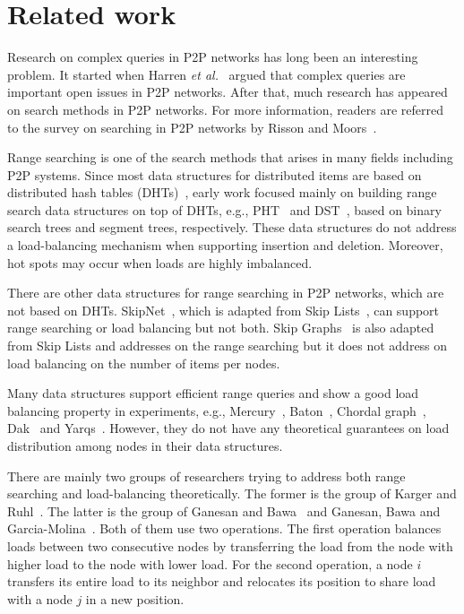 \documentclass[a4paper]{article}
\begin{document}
\section{Related work}
\label{sec:relatedwork}

Research on complex queries in P2P networks has long been an
interesting problem. It started when Harren {\em et
  al.}~\cite{Harren02complexqueries} argued that  complex queries
are important open issues in P2P networks. After that, much research has appeared on search methods in P2P networks. For more
information, readers are referred to the survey on searching in P2P
networks by Risson and Moors~\cite{Risson06Survey}.

Range searching is one of the search methods that arises in many fields
including P2P systems. Since most data structures for distributed
items are based on distributed hash tables (DHTs)~\cite{Kademlia02, CAN01,
  Pastry01,  Chord03, tapestry04}, early work focused mainly
on building range search data structures on top of DHTs, e.g.,
PHT~\cite{PHT2004} and DST~\cite{DST06}, based on binary search trees
and segment trees, respectively. These data structures do not address a
load-balancing mechanism when supporting insertion and deletion. Moreover,
hot spots may occur when loads are highly imbalanced.

There are other data structures for range searching in P2P networks,
which are not based on DHTs. SkipNet~\cite{SkipNet03}, which is adapted
from Skip Lists~\cite{skiplist90}, can support range searching or load
balancing but not both. Skip Graphs~\cite{Aspnes-SODA03} is also adapted from Skip Lists and
addresses on the range searching but it does not address on load balancing on the number of items per nodes.

Many data structures support efficient range queries and show a good 
load balancing property in experiments, e.g.,
Mercury~\cite{Mercury_sigcomm04}, Baton~\cite{baton05},
 Chordal graph~\cite{Joung08}, Dak~\cite{Dak06} and
Yarqs~\cite{Yarqs09}. However, they do not have any
theoretical guarantees on load distribution among nodes in their data
structures.

There are mainly two groups of researchers trying to address both range searching and
load-balancing theoretically. The former is the group of Karger and Ruhl~\cite{Karger03newalgorithms, 
Karger04simpleefficient}. The latter is the group of Ganesan and Bawa~\cite{Ganesan03} 
and Ganesan, Bawa and Garcia-Molina~\cite{GanesanBGM04-vldb}. 
Both of them use two operations. The first operation balances loads between two consecutive nodes 
by transferring the load from the node with higher load to the node with lower load. For the second operation, a node $i$ 
transfers its entire load to its neighbor and relocates its position to share load with 
a node $j$ in a new position.
\end{document}

